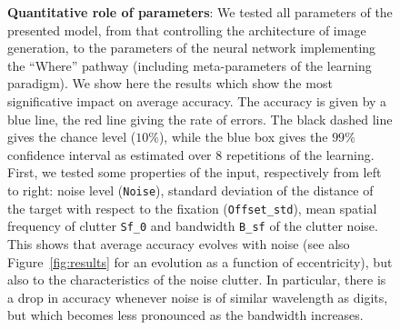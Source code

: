 \begin{figure}[t!]%
	\caption{
		{\bf Quantitative role of parameters}:
		We tested all parameters of the presented model, from that controlling the architecture of image generation, to the parameters of the neural network implementing the ``Where'' pathway (including meta-parameters of the learning paradigm). We show here the results which show the most significative impact on average accuracy.
		The accuracy is given by a blue line, the red line giving the rate of errors. The black dashed line gives the chance level ($10\%$), while the blue box gives the $99\%$ confidence interval as estimated over $8$ repetitions of the learning. %
		\A First, we tested some properties of the input, respectively from left to right: noise level (\texttt{Noise}), standard deviation  of the distance of the target with respect to the fixation (\texttt{Offset\_std}), mean spatial frequency of clutter \texttt{Sf\_0} and bandwidth \texttt{B\_sf} of the clutter noise. This shows that average accuracy evolves with noise (see also Figure~\ref{fig:results} for an evolution as a function of eccentricity), but also to the characteristics of the noise clutter. In particular, there is a drop in accuracy whenever noise is of similar wavelength as digits, but which becomes less pronounced as the bandwidth increases. %
}
\end{figure}
